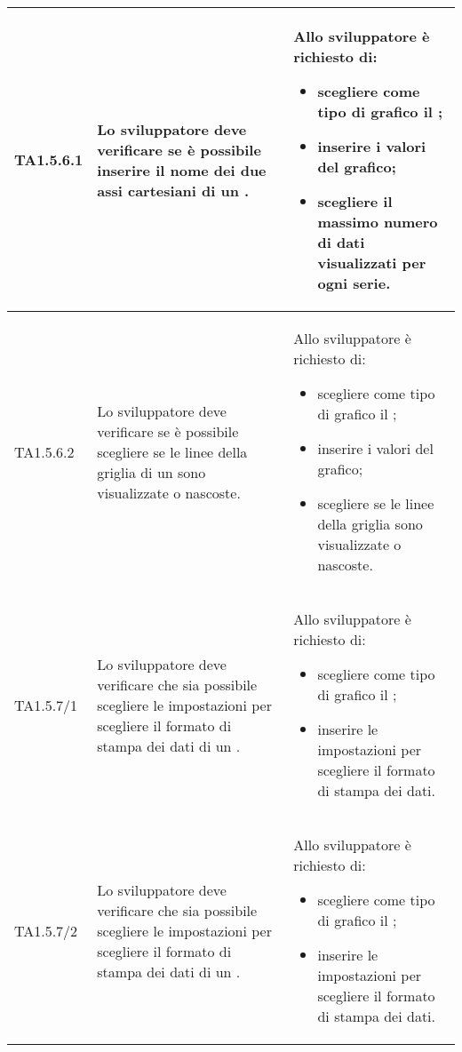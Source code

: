 \begin{longtabu}{| X[0.5] | X | X |}
	TA1.5.6.1 & Lo sviluppatore deve verificare se è possibile inserire il nome dei due assi cartesiani di un .

		& Allo sviluppatore è richiesto di:
		\begin{itemize}
			\item scegliere come tipo di grafico il ;
			\item inserire i valori del grafico;
			\item scegliere il massimo numero di dati visualizzati per ogni serie.
		\end{itemize}
\\ \hline

	TA1.5.6.2 & Lo sviluppatore deve verificare se è possibile scegliere se le linee della griglia di un  sono visualizzate o nascoste.

		& Allo sviluppatore è richiesto di:
		\begin{itemize}
			\item scegliere come tipo di grafico il ;
			\item inserire i valori del grafico;
			\item scegliere se le linee della griglia sono visualizzate o nascoste.
		\end{itemize}
\\ \hline

	TA1.5.7/1 & Lo sviluppatore deve verificare che sia possibile scegliere le impostazioni per scegliere il formato di stampa dei dati di un .

		& Allo sviluppatore è richiesto di:
		\begin{itemize}
			\item scegliere come tipo di grafico il ;
			\item inserire le impostazioni per scegliere il formato di stampa dei dati.
		\end{itemize}
\\ \hline

	TA1.5.7/2 & Lo sviluppatore deve verificare che sia possibile scegliere le impostazioni per scegliere il formato di stampa dei dati di un .

		& Allo sviluppatore è richiesto di:
		\begin{itemize}
			\item scegliere come tipo di grafico il ;
			\item inserire le impostazioni per scegliere il formato di stampa dei dati.
		\end{itemize}
\\ \hline


\end{longtabu}

